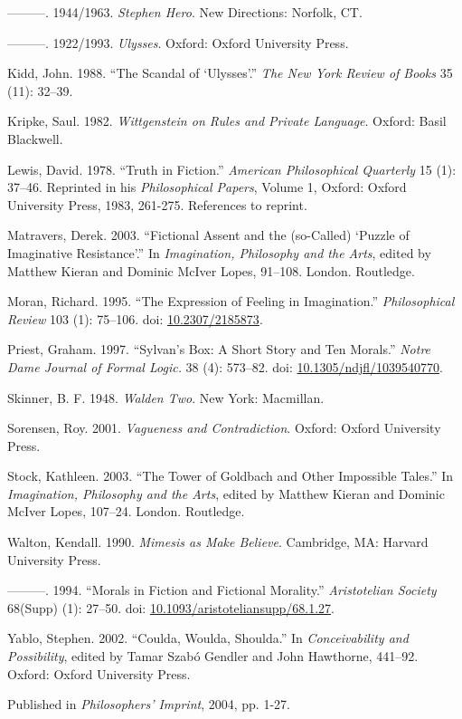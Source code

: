 \documentclass[
  11pt,
  letterpaper,
  DIV=11,
  numbers=noendperiod,
  twoside]{scrartcl}
\newlength{\cslhangindent}
\newenvironment{CSLReferences}[2] %
 {\begin{list}{}{%
  \setlength{\itemindent}{0pt}
  \setlength{\leftmargin}{0pt}
  \setlength{\parsep}{0pt}
  \ifodd #1
   \setlength{\leftmargin}{\cslhangindent}
   \setlength{\itemindent}{-1\cslhangindent}
  \fi
  \setlength{\itemsep}{#2\baselineskip}}}
 {\end{list}}
\begin{document}
\begin{CSLReferences}{1}{0}
---------. 1944/1963. \emph{Stephen Hero}. New Directions: Norfolk, CT.

---------. 1922/1993. \emph{Ulysses}. Oxford: Oxford University Press.

Kidd, John. 1988. {``The Scandal of {`Ulysses'}.''} \emph{The New York
Review of Books} 35 (11): 32--39.

Kripke, Saul. 1982. \emph{Wittgenstein on Rules and Private Language}.
Oxford: Basil Blackwell.

Lewis, David. 1978. {``Truth in Fiction.''} \emph{American Philosophical
Quarterly} 15 (1): 37--46. Reprinted in his \emph{Philosophical Papers},
Volume 1, Oxford: Oxford University Press, 1983, 261-275. References to
reprint.

Matravers, Derek. 2003. {``Fictional Assent and the (so-Called) {`Puzzle
of Imaginative Resistance'}.''} In \emph{Imagination, Philosophy and the
Arts}, edited by Matthew Kieran and Dominic McIver Lopes, 91--108.
London. Routledge.

Moran, Richard. 1995. {``The Expression of Feeling in Imagination.''}
\emph{Philosophical Review} 103 (1): 75--106. doi:
\href{https://doi.org/10.2307/2185873}{10.2307/2185873}.

Priest, Graham. 1997. {``Sylvan's Box: A Short Story and Ten Morals.''}
\emph{Notre Dame Journal of Formal Logic.} 38 (4): 573--82. doi:
\href{https://doi.org/10.1305/ndjfl/1039540770}{10.1305/ndjfl/1039540770}.

Skinner, B. F. 1948. \emph{Walden Two}. New York: Macmillan.

Sorensen, Roy. 2001. \emph{Vagueness and Contradiction}. Oxford: Oxford
University Press.

Stock, Kathleen. 2003. {``The Tower of Goldbach and Other Impossible
Tales.''} In \emph{Imagination, Philosophy and the Arts}, edited by
Matthew Kieran and Dominic McIver Lopes, 107--24. London. Routledge.

Walton, Kendall. 1990. \emph{Mimesis as Make Believe}. Cambridge, MA:
Harvard University Press.

---------. 1994. {``Morals in Fiction and Fictional Morality.''}
\emph{Aristotelian Society} 68(Supp) (1): 27--50. doi:
\href{https://doi.org/10.1093/aristoteliansupp/68.1.27}{10.1093/aristoteliansupp/68.1.27}.

Yablo, Stephen. 2002. {``Coulda, Woulda, Shoulda.''} In
\emph{Conceivability and Possibility}, edited by Tamar Szabó Gendler and
John Hawthorne, 441--92. Oxford: Oxford University Press.

\end{CSLReferences}



\noindent Published in\emph{
Philosophers’ Imprint}, 2004, pp. 1-27.
\end{document}
